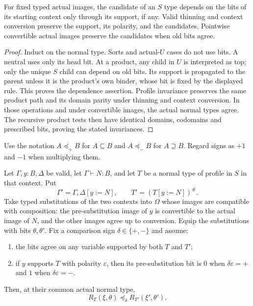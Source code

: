 \begin{lemma}
\label{lem:support-dependence}
For fixed typed actual images, the candidate of an $S$ type depends
on the bits of its starting context only through its support, if any.
Valid thinning and context conversion preserve the support, its
polarity, and the candidates. Pointwise convertible actual images
preserve the candidates when old bits agree.
\end{lemma}

\begin{proof}
Induct on the normal type. Sorts and actual-$U$ cases do not use
bits. A neutral uses only its head bit. At a product, any child in
$U$ is interpreted as top; only the unique $S$ child can depend on
old bits. Its support is propagated to the parent unless it is the
product's own binder, whose bit is fixed by the displayed rule.
This proves the dependence assertion. Profile invariance preserves
the same product path and its domain parity under thinning and
context conversion. In those operations and under convertible images,
the actual normal types agree. The recursive product tests then have
identical domains, codomains and prescribed bits, proving the stated
invariances.
\end{proof}

Use the notation $A\preceq_+B$ for $A\subseteq B$ and
$A\preceq_-B$ for $A\supseteq B$. Regard signs as $+1$ and $-1$
when multiplying them.

\begin{lemma}
\label{lem:support-substitution}
Let $\Gamma,y:B,\Delta$ be valid, let $\Gamma\vdash N:B$, and
let $T$ be a normal type of profile in $S$ in that context. Put
\[
 \Gamma'=\Gamma,\Delta[y:=N],\qquad
                         T'=(T[y:=N])^\#.
\]
Take typed substitutions of the two contexts into $\Omega$ whose
images are compatible with composition: the pre-substitution image
of $y$ is convertible to the actual image of $N$, and the other
images agree up to conversion. Equip the substitutions with bits
$\theta,\theta'$. Fix a comparison sign $\delta\in\{+,-\}$ and
assume:
\begin{enumerate}
\item the bits agree on any variable supported by both $T$ and $T'$;
\item if $y$ supports $T$ with polarity $\varepsilon$, then its
      pre-substitution bit is $0$ when $\delta\varepsilon=+$ and
      $1$ when $\delta\varepsilon=-$.
\end{enumerate}
Then, at their common actual normal type,
\[
             R_T(\xi,\theta)
                  \preceq_\delta R_{T'}(\xi',\theta').
\]
\end{lemma}

